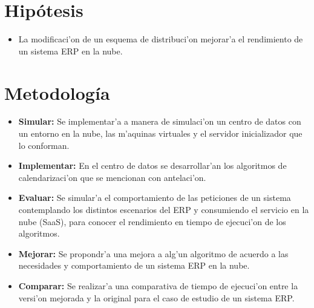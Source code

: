 
\chapter*{Hip\'otesis}


\begin{itemize}
\item La modificaci'on de un esquema de distribuci'on mejorar'a el rendimiento de un sistema ERP en la nube.
\end{itemize}


\chapter*{Metodolog\'ia}

\begin{itemize}
\item \textbf{Simular:} Se implementar'a a manera de simulaci'on un centro de datos con un entorno en la nube, las m'aquinas virtuales y el servidor inicializador que lo conforman.
\item \textbf{Implementar:} En el centro de datos se desarrollar'an los algoritmos de calendarizaci'on que se mencionan con antelaci'on.
\item \textbf{Evaluar:} Se simular'a el comportamiento de las peticiones de un sistema contemplando los distintos escenarios del ERP y consumiendo el servicio en la nube (SaaS), para conocer el rendimiento en tiempo de ejecuci'on de los algoritmos.
\item \textbf{Mejorar:} Se propondr'a una mejora a alg'un algoritmo de acuerdo a las necesidades y comportamiento de un sistema ERP en la nube.
\item \textbf{Comparar:} Se realizar'a una comparativa de tiempo de ejecuci'on entre la versi'on mejorada y la original para el caso de estudio de un sistema ERP.
\end{itemize}